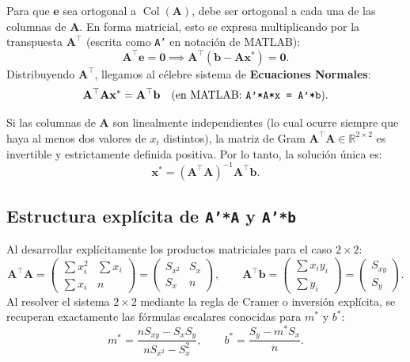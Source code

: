 ﻿\documentclass[12pt, a4paper]{article}
\newcommand{\R}{\mathbb{R}}
\newcommand{\mstar}{m^{*}}
\newcommand{\bstar}{b^{*}}
\newcommand{\T}{{\top}}
\begin{document}
Para que $\mathbf{e}$ sea ortogonal a $\operatorname{Col}(\mathbf{A})$, debe ser ortogonal a cada una de las columnas de $\mathbf{A}$. En forma matricial, esto se expresa multiplicando por la transpuesta $\mathbf{A}^\T$ (escrita como \texttt{A'} en notación de MATLAB):
\[
    \mathbf{A}^\T \mathbf{e} = \mathbf{0}
    \implies \mathbf{A}^\T (\mathbf{b} - \mathbf{A}\mathbf{x}^*) = \mathbf{0}.
\]
Distribuyendo $\mathbf{A}^\T$, llegamos al célebre sistema de \textbf{Ecuaciones Normales}:
\begin{equation}\label{eq:ecuaciones_normales}
    \mathbf{A}^\T \mathbf{A} \mathbf{x}^* = \mathbf{A}^\T \mathbf{b}
    \quad \text{(en MATLAB: \texttt{A'*A*x = A'*b})}.
\end{equation}

Si las columnas de $\mathbf{A}$ son linealmente independientes (lo cual ocurre siempre que haya al menos dos valores de $x_i$ distintos), la matriz de Gram $\mathbf{A}^\T \mathbf{A} \in \R^{2 \times 2}$ es invertible y estrictamente definida positiva. Por lo tanto, la solución única es:
\begin{equation}\label{eq:sol_matriz}
    \mathbf{x}^* = (\mathbf{A}^\T \mathbf{A})^{-1} \mathbf{A}^\T \mathbf{b}.
\end{equation}

\subsection{Estructura explícita de \texttt{A'*A} y \texttt{A'*b}}

Al desarrollar explícitamente los productos matriciales para el caso $2 \times 2$:
\[
    \mathbf{A}^\T \mathbf{A} = \begin{pmatrix}
        \sum x_i^2 & \sum x_i \\
        \sum x_i   & n
    \end{pmatrix}
    = \begin{pmatrix}
        S_{x^2} & S_x \\
        S_x     & n
    \end{pmatrix}, \qquad
    \mathbf{A}^\T \mathbf{b} = \begin{pmatrix}
        \sum x_i y_i \\ \sum y_i
    \end{pmatrix}
    = \begin{pmatrix}
        S_{xy} \\ S_y
    \end{pmatrix}.
\]
Al resolver el sistema $2 \times 2$ mediante la regla de Cramer o inversión explícita, se recuperan exactamente las fórmulas escalares conocidas para $\mstar$ y $\bstar$:
\[
    \mstar = \frac{n S_{xy} - S_x S_y}{n S_{x^2} - S_x^2}, \qquad
    \bstar = \frac{S_y - \mstar S_x}{n}.
\]
\end{document}
